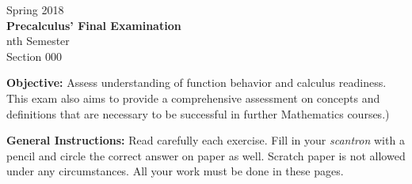 \documentclass[legalpaper, 12pt, addpoints]{exam}
\begin{document}
\begin{coverpages}


\begin{center}
Spring 2018 \\
\textbf{Precalculus' Final Examination } \\
nth Semester \\
Section 000
\end{center}
\extraheadheight{-0.8in}

\vspace{0.25in}
\parbox{6in}{
\textbf{Objective:} Assess understanding of function behavior and calculus readiness. This exam also aims to provide a comprehensive assessment on concepts and definitions that are necessary to be successful in further Mathematics courses.)}
\vspace{0.15in}

\parbox{6in}{{\textbf{General Instructions:} Read carefully each exercise. Fill in your \textit{scantron} with a pencil and circle the correct answer on paper as well. Scratch paper is not allowed under any circumstances. All your work must be done in these pages.}
\vspace{0.15in}}

 \begin{center}
\end{center}
\end{coverpages}
\end{document}
